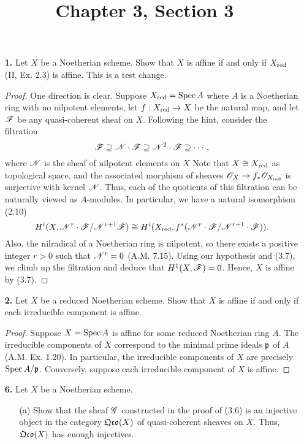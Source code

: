 \documentclass{article}
\title{Chapter 3, Section 3}
\begin{document}
\maketitle
\begin{enumerate} [label=\textbf{\arabic*.}, leftmargin=0em]

\item[\textbf{1.}] Let $X$ be a Noetherian scheme.
Show that $X$ is affine if and only if $X_{\text{red}}$ (II, Ex. 2.3) is affine.
This is a test change.

\begin{proof}
One direction is clear.
Suppose $X_{\text{red}} = \operatorname{Spec}{A}$ where $A$ is a Noetherian ring with no nilpotent elements, let $f : X_{\text{red}} \to X$ be the natural map, and let $\mathscr{F}$ be any quasi-coherent sheaf on $X$. 
Following the hint, consider the filtration
\begin{equation*}
  \mathscr{F} \supseteq \mathscr{N} \cdot \mathscr{F} \supseteq \mathscr{N}^2 \cdot \mathscr{F} \supseteq \cdots,
\end{equation*}
where $\mathscr{N}$ is the sheaf of nilpotent elements on $X$
Note that $X \cong X_{\text{red}}$ as topological space, and the associated morphism of sheaves $\mathscr{O}_X \to f_* \mathscr{O}_{X_{\text{red}}}$ is surjective with kernel $\mathscr{N}$.
Thus, each of the quotients of this filtration can be naturally viewed as $A$-modules.
In particular, we have a natural isomorphism (2.10) $$H^i(X, \mathscr{N}^r \cdot \mathscr{F} / \mathscr{N}^{r + 1} \mathscr{F}) \cong H^i(X_{\text{red}}, f^*(\mathscr{N}^r \cdot \mathscr{F} / \mathscr{N}^{r + 1} \cdot \mathscr{F})).$$
Also, the nilradical of a Noetherian ring is nilpotent, so there exists a positive integer $r > 0$ such that $\mathscr{N}^r = 0$ (A.M. 7.15).
Using our hypothesis and (3.7), we climb up the filtration and deduce that $H^1(X, \mathscr{F}) = 0$.
Hence, $X$ is affine by (3.7).
\end{proof}

\item[\textbf{2.}] Let $X$ be a reduced Noetherian scheme.
Show that $X$ is affine if and only if each irreducible component is affine.

\begin{proof}
Suppose $X = \operatorname{Spec}{A}$ is affine for some reduced Noetherian ring $A$.
The irreducible components of $X$ correspond to the minimal prime ideals $\mathfrak{p}$ of $A$ (A.M. Ex. 1.20).
In particular, the irreducible components of $X$ are precisely $\operatorname{Spec}{A / \mathfrak{p}}$.
Conversely, suppose each irreducible component of $X$ is affine.
\end{proof}

\item[\textbf{6.}] Let $X$ be a Noetherian scheme.
\begin{itemize}
  \item[(a)] Show that the sheaf $\mathscr{G}$ constructed in the proof of (3.6) is an injective object in the category $\mathfrak{Qco}(X)$ of quasi-coherent sheaves on $X$.
  Thus, $\mathfrak{Qco}(X)$ has enough injectives.


\end{itemize}
\end{enumerate}
\end{document}
